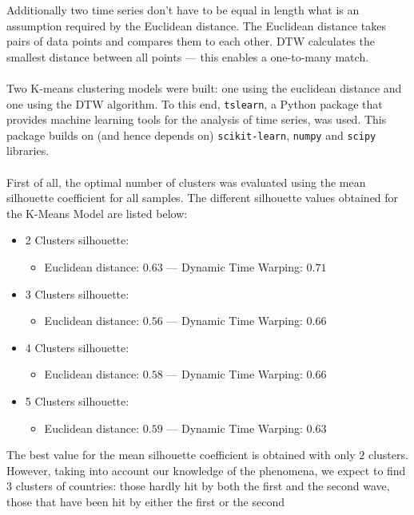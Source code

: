 \documentclass[11pt,a4paper]{article}
\begin{document}
\noindent Additionally two time series don't have to be equal in length what is
an assumption required by the Euclidean distance. The Euclidean distance takes
pairs of data points and compares them to each other. DTW calculates the
smallest distance between all points --- this enables a one-to-many match.\\
\\
Two K-means clustering models were built: one using the euclidean distance and
one using the DTW algorithm. To this end, \texttt{tslearn}, a Python package
that provides machine learning tools for the analysis of time series, was used.
This package builds on (and hence depends on) \texttt{scikit-learn},
\texttt{numpy} and \texttt{scipy} libraries.\\
\\
First of all, the optimal number of clusters was evaluated using the mean
silhouette coefficient for all samples. The different silhouette values obtained
for the K-Means Model are listed below:
\begin{itemize}
    \item 2 Clusters silhouette:
    \begin{itemize}
        \item Euclidean distance: $0.63$ --- Dynamic Time Warping: $0.71$
    \end{itemize}
    \item 3 Clusters silhouette:
    \begin{itemize}
        \item Euclidean distance: $0.56$ --- Dynamic Time Warping: $0.66$
    \end{itemize}
    \item 4 Clusters silhouette:
    \begin{itemize}
        \item Euclidean distance: $0.58$ --- Dynamic Time Warping: $0.66$
    \end{itemize}
    \item 5 Clusters silhouette:
    \begin{itemize}
        \item Euclidean distance: $0.59$ --- Dynamic Time Warping: $0.63$
    \end{itemize}
\end{itemize}
The best value for the mean silhouette coefficient is obtained with only $2$
clusters. However, taking into account our knowledge of the phenomena, we
expect to find $3$ clusters of countries: those hardly hit by both the first and
the second wave, those that have been hit by either the first or the second
\end{document}
